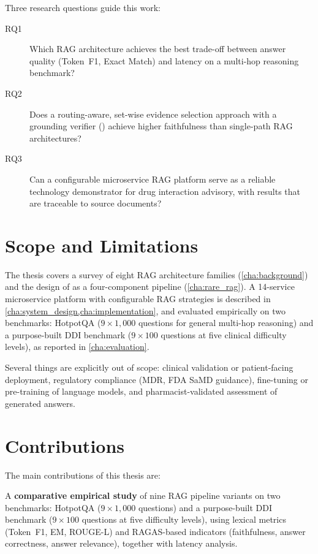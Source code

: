 Three research questions guide this work:

\begin{description}
  \item[RQ1] Which RAG architecture achieves the best trade-off between answer quality
    (Token~F1, Exact Match) and latency on a multi-hop reasoning benchmark?

  \item[RQ2] Does a routing-aware, set-wise evidence selection approach with a grounding
    verifier (\rarerag{}) achieve higher faithfulness than single-path RAG architectures?

  \item[RQ3] Can a configurable microservice RAG platform serve as a reliable technology
    demonstrator for drug interaction advisory, with results that are traceable to source
    documents?
\end{description}

\section{Scope and Limitations}
\label{sec:scope}

The thesis covers a survey of eight RAG architecture families (\cref{cha:background})
and the design of \rarerag{} as a four-component pipeline (\cref{cha:rare_rag}).
A 14-service microservice platform with configurable RAG strategies is described
in \cref{cha:system_design,cha:implementation}, and evaluated empirically on
two benchmarks: HotpotQA ($9 \times 1{,}000$ questions for general multi-hop reasoning)
and a purpose-built DDI benchmark ($9 \times 100$ questions at five clinical difficulty
levels), as reported in \cref{cha:evaluation}.

Several things are explicitly out of scope: clinical validation or patient-facing
deployment, regulatory compliance (MDR, FDA SaMD guidance), fine-tuning or pre-training
of language models, and pharmacist-validated assessment of generated answers.

\section{Contributions}
\label{sec:contributions}

The main contributions of this thesis are:

A \textbf{comparative empirical study} of nine RAG pipeline variants on two benchmarks:
HotpotQA ($9 \times 1{,}000$ questions) and a purpose-built DDI benchmark
($9 \times 100$ questions at five difficulty levels), using lexical metrics
(Token~F1, EM, ROUGE-L) and RAGAS-based indicators (faithfulness, answer correctness,
answer relevance), together with latency analysis.

